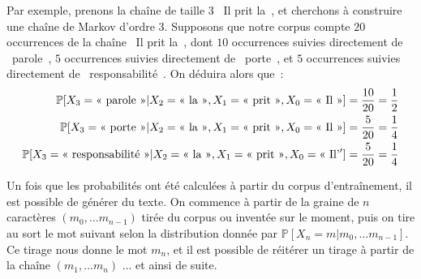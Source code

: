 \documentclass{article}
\begin{document}
				Par exemple, prenons la chaîne de taille $3$ \guillemotleft~Il prit la~\guillemotright, et cherchons à construire une chaîne de Markov d'ordre $3$. Supposons que notre corpus compte $20$ occurrences de la chaîne \guillemotleft~Il prit la~\guillemotright, dont $10$ occurrences suivies directement de \guillemotleft~parole~\guillemotright, $5$ occurrences suivies directement de \guillemotleft~porte~\guillemotright, et $5$ occurrences suivies directement de \guillemotleft~responsabilité~\guillemotright. On déduira alors que~:
				\begin{eqnarray}
					\mathbb{P}[X_3 = \mbox{\guillemotleft~parole~\guillemotright} | X_2 = \mbox{\guillemotleft~la~\guillemotright}, X_1 = \mbox{\guillemotleft~prit~\guillemotright}, X_0 = \mbox{\guillemotleft~Il~\guillemotright}] = \frac{10}{20} = \frac{1}{2}\\
					\mathbb{P}[X_3 = \mbox{\guillemotleft~porte~\guillemotright} | X_2 = \mbox{\guillemotleft~la~\guillemotright}, X_1 = \mbox{\guillemotleft~prit~\guillemotright}, X_0 = \mbox{\guillemotleft~Il~\guillemotright}] = \frac{5}{20} = \frac{1}{4}\\
					\mathbb{P}[X_3 = \mbox{\guillemotleft~responsabilité~\guillemotright} | X_2 = \mbox{\guillemotleft~la~\guillemotright}, X_1 = \mbox{\guillemotleft~prit~\guillemotright}, X_0 = \mbox{\guillemotleft~Il'}'] = \frac{5}{20} = \frac{1}{4}
				\end{eqnarray}
				
				Un fois que les probabilités ont été calculées à partir du corpus d'entraînement, il est possible de générer du texte. On commence à partir de la graine de $n$ caractères $(m_0, \dots m_{n-1})$ tirée du corpus ou inventée sur le moment, puis on tire au sort le mot suivant selon la distribution donnée par $\mathbb{P}[X_n = m| m_0, \dots m_{n-1}]$. Ce tirage nous donne le mot $m_n$, et il est possible de réitérer un tirage à partir de la chaîne $(m_1, \dots m_n)$ ... et ainsi de suite.\\
				
\end{document}
